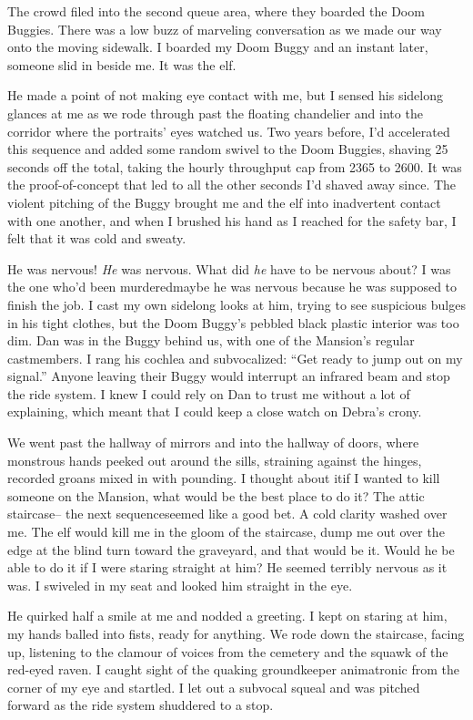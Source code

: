 The crowd filed into the second queue area, where they boarded the
Doom Buggies. There was a low buzz of marveling conversation as we
made our way onto the moving sidewalk. I boarded my Doom Buggy and
an instant later, someone slid in beside me. It was the elf.

He made a point of not making eye contact with me, but I sensed his
sidelong glances at me as we rode through past the floating
chandelier and into the corridor where the portraits' eyes watched
us. Two years before, I'd accelerated this sequence and added some
random swivel to the Doom Buggies, shaving 25 seconds off the
total, taking the hourly throughput cap from 2365 to 2600. It was
the proof-of-concept that led to all the other seconds I'd shaved
away since. The violent pitching of the Buggy brought me and the
elf into inadvertent contact with one another, and when I brushed
his hand as I reached for the safety bar, I felt that it was cold
and sweaty.

He was nervous! \emph{He} was nervous. What did \emph{he} have to
be nervous about? I was the one who'd been murdered{\dash}maybe he was
nervous because he was supposed to finish the job. I cast my own
sidelong looks at him, trying to see suspicious bulges in his tight
clothes, but the Doom Buggy's pebbled black plastic interior was
too dim. Dan was in the Buggy behind us, with one of the Mansion's
regular castmembers. I rang his cochlea and subvocalized: “Get
ready to jump out on my signal.” Anyone leaving their Buggy would
interrupt an infrared beam and stop the ride system. I knew I could
rely on Dan to trust me without a lot of explaining, which meant
that I could keep a close watch on Debra's crony.

We went past the hallway of mirrors and into the hallway of doors,
where monstrous hands peeked out around the sills, straining
against the hinges, recorded groans mixed in with pounding. I
thought about it{\dash}if I wanted to kill someone on the Mansion, what
would be the best place to do it? The attic staircase-- the next
sequence{\dash}seemed like a good bet. A cold clarity washed over me. The
elf would kill me in the gloom of the staircase, dump me out over
the edge at the blind turn toward the graveyard, and that would be
it. Would he be able to do it if I were staring straight at him? He
seemed terribly nervous as it was. I swiveled in my seat and looked
him straight in the eye.

He quirked half a smile at me and nodded a greeting. I kept on
staring at him, my hands balled into fists, ready for anything. We
rode down the staircase, facing up, listening to the clamour of
voices from the cemetery and the squawk of the red-eyed raven. I
caught sight of the quaking groundkeeper animatronic from the
corner of my eye and startled. I let out a subvocal squeal and was
pitched forward as the ride system shuddered to a stop.

